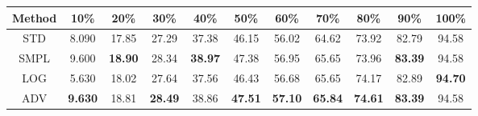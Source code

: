 \documentclass{standalone}
\begin{document}
\begin{tabular}{c|cccccccccc}
      \toprule
      Method & 10\% & 20\% & 30\% & 40\% & 50\% & 60\% & 70\% & 80\% & 90\% & 100\% \\
      \midrule
STD & 8.090 & 17.85 & 27.29 & 37.38 & 46.15 & 56.02 & 64.62 & 73.92 & 82.79 & 94.58\\
SMPL & 9.600 & \textbf{18.90} & 28.34 & \textbf{38.97} & 47.38 & 56.95 & 65.65 & 73.96 & \textbf{83.39} & 94.58\\
LOG & 5.630 & 18.02 & 27.64 & 37.56 & 46.43 & 56.68 & 65.65 & 74.17 & 82.89 & \textbf{94.70}\\
ADV & \textbf{9.630} & 18.81 & \textbf{28.49} & 38.86 & \textbf{47.51} & \textbf{57.10} & \textbf{65.84} & \textbf{74.61} & \textbf{83.39} & 94.58\\
  \bottomrule
\end{tabular}
\end{document}
